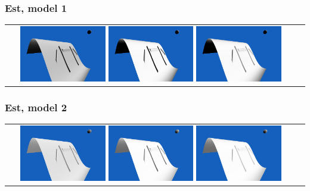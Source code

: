 \documentclass[a4paper]{article}
\begin{document}
\subsubsection{Est, model 1}
\begin{tabular}{cc}
\includegraphics[width=0.3\textwidth]{Images/Essais/Essai_8_phong_East_0.png}
\includegraphics[width=0.3\textwidth]{Images/Essais/Essai_8_slint_East_0.png}
\includegraphics[width=0.3\textwidth]{Images/Essais/Essai_9_slint_East_0.png}
\end{tabular}
\subsubsection{Est, model 2}
\begin{tabular}{cc}
\includegraphics[width=0.3\textwidth]{Images/Essais/Essai_8_phong_East_1.png}
\includegraphics[width=0.3\textwidth]{Images/Essais/Essai_8_slint_East_1.png}
\includegraphics[width=0.3\textwidth]{Images/Essais/Essai_9_slint_East_1.png}

\end{tabular}
\end{document}
